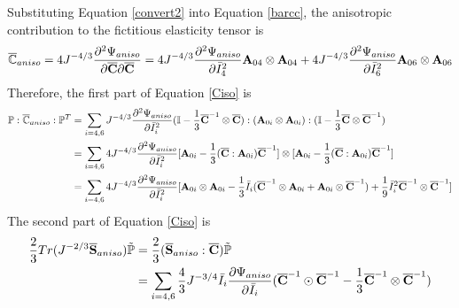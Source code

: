 Substituting Equation \ref{convert2} into Equation \ref{barcc}, the anisotropic contribution to the fictitious elasticity tensor is
\begin{equation} \label{anisobarcc}
\overline{\mathbb{C}}_{aniso} = 4J^{-4/3}\frac{\partial^2\Psi_{aniso}}{\partial\overline{\bold{C}}\partial\overline{\bold{C}}} = 4J^{-4/3}\frac{\partial^2\Psi_{aniso}}{\partial{\bar{I}_4}^2}\bold{A}_{04} \otimes \bold{A}_{04} +
4J^{-4/3}\frac{\partial^2\Psi_{aniso}}{\partial{\bar{I}_6}^2}\bold{A}_{06} \otimes \bold{A}_{06}
\end{equation}
Therefore, the first part of Equation \ref{Ciso} is 
\begin{equation} \label{HGOpart1}
\begin{split}
\mathbb{P} : \overline{\mathbb{C}}_{aniso} : \mathbb{P}^T &= \sum_{i = 4, 6}J^{-4/3}\frac{\partial^2\Psi_{aniso}}{\partial{\bar{I}_i}^2} (\mathbb{I} - \frac{1}{3}\overline{\bold{C}}^{-1} \otimes \overline{\bold{C}}):(\bold{A}_{0i} \otimes \bold{A}_{0i}):(\mathbb{I} - \frac{1}{3}\overline{\bold{C}} \otimes \overline{\bold{C}}^{-1}) \\
&= \sum_{i = 4, 6} 4J^{-4/3}\frac{\partial^2\Psi_{aniso}}{\partial{\bar{I}_i}^2}
[\bold{A}_{0i} - \frac{1}{3}(\overline{\bold{C}} : \bold{A}_{0i})\overline{\bold{C}}^{-1}] \otimes
[\bold{A}_{0i} - \frac{1}{3}(\overline{\bold{C}} : \bold{A}_{0i})\overline{\bold{C}}^{-1}] \\
&= \sum_{i = 4, 6} 4J^{-4/3}\frac{\partial^2\Psi_{aniso}}{\partial{\bar{I}_i}^2}
[\bold{A}_{0i} \otimes \bold{A}_{0i} - \frac{1}{3}\bar{I}_i
(\overline{\bold{C}}^{-1} \otimes \bold{A}_{0i} + \bold{A}_{0i} \otimes \overline{\bold{C}}^{-1}) 
+ \frac{1}{9}\bar{I}_i^2 \overline{\bold{C}}^{-1} \otimes \overline{\bold{C}}^{-1}]
\end{split}
\end{equation}
The second part of Equation \ref{Ciso} is
\begin{equation} \label{HGOpart2}
\begin{split}
\frac{2}{3}Tr(J^{-2/3}\overline{\bold{S}}_{aniso})\tilde{\mathbb{P}} &= \frac{2}{3}(\overline{\bold{S}}_{aniso} : \overline{\bold{C}}) \tilde{\mathbb{P}} \\
&= \sum_{i = 4, 6}\frac{4}{3}J^{-3/4}\bar{I}_i\frac{\partial{\Psi_{aniso}}}{\partial\bar{I}_i}
(\overline{\bold{C}}^{-1} \odot \overline{\bold{C}}^{-1} - \frac{1}{3}\overline{\bold{C}}^{-1}\otimes\overline{\bold{C}}^{-1}) \\
\end{split}
\end{equation}
